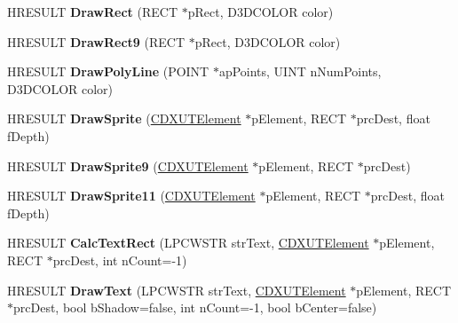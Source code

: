 \begin{DoxyCompactItemize}
\item 
\hypertarget{class_c_d_x_u_t_dialog_adccd346391230d10adfe508ee29a2a8d}{H\+R\+E\+S\+U\+L\+T {\bfseries Draw\+Rect} (R\+E\+C\+T $\ast$p\+Rect, D3\+D\+C\+O\+L\+O\+R color)}\label{class_c_d_x_u_t_dialog_adccd346391230d10adfe508ee29a2a8d}

\item 
\hypertarget{class_c_d_x_u_t_dialog_aa7a777479672b1d96026d78f3d8d65da}{H\+R\+E\+S\+U\+L\+T {\bfseries Draw\+Rect9} (R\+E\+C\+T $\ast$p\+Rect, D3\+D\+C\+O\+L\+O\+R color)}\label{class_c_d_x_u_t_dialog_aa7a777479672b1d96026d78f3d8d65da}

\item 
\hypertarget{class_c_d_x_u_t_dialog_ad3345a7a307fa37e32cb3035a127306f}{H\+R\+E\+S\+U\+L\+T {\bfseries Draw\+Poly\+Line} (P\+O\+I\+N\+T $\ast$ap\+Points, U\+I\+N\+T n\+Num\+Points, D3\+D\+C\+O\+L\+O\+R color)}\label{class_c_d_x_u_t_dialog_ad3345a7a307fa37e32cb3035a127306f}

\item 
\hypertarget{class_c_d_x_u_t_dialog_ab9c6ec0e7fcd65dab08636c65df98001}{H\+R\+E\+S\+U\+L\+T {\bfseries Draw\+Sprite} (\hyperlink{class_c_d_x_u_t_element}{C\+D\+X\+U\+T\+Element} $\ast$p\+Element, R\+E\+C\+T $\ast$prc\+Dest, float f\+Depth)}\label{class_c_d_x_u_t_dialog_ab9c6ec0e7fcd65dab08636c65df98001}

\item 
\hypertarget{class_c_d_x_u_t_dialog_ab06d4fafb9f6ff3362878c2fb00aaf5a}{H\+R\+E\+S\+U\+L\+T {\bfseries Draw\+Sprite9} (\hyperlink{class_c_d_x_u_t_element}{C\+D\+X\+U\+T\+Element} $\ast$p\+Element, R\+E\+C\+T $\ast$prc\+Dest)}\label{class_c_d_x_u_t_dialog_ab06d4fafb9f6ff3362878c2fb00aaf5a}

\item 
\hypertarget{class_c_d_x_u_t_dialog_ab0558eb82095a795bba31070fd5b87f0}{H\+R\+E\+S\+U\+L\+T {\bfseries Draw\+Sprite11} (\hyperlink{class_c_d_x_u_t_element}{C\+D\+X\+U\+T\+Element} $\ast$p\+Element, R\+E\+C\+T $\ast$prc\+Dest, float f\+Depth)}\label{class_c_d_x_u_t_dialog_ab0558eb82095a795bba31070fd5b87f0}

\item 
\hypertarget{class_c_d_x_u_t_dialog_a94d782e76e3e635c67e9d4326dfa9b66}{H\+R\+E\+S\+U\+L\+T {\bfseries Calc\+Text\+Rect} (L\+P\+C\+W\+S\+T\+R str\+Text, \hyperlink{class_c_d_x_u_t_element}{C\+D\+X\+U\+T\+Element} $\ast$p\+Element, R\+E\+C\+T $\ast$prc\+Dest, int n\+Count=-\/1)}\label{class_c_d_x_u_t_dialog_a94d782e76e3e635c67e9d4326dfa9b66}

\item 
\hypertarget{class_c_d_x_u_t_dialog_ab08e695a11e312861cb65a3221b28bc9}{H\+R\+E\+S\+U\+L\+T {\bfseries Draw\+Text} (L\+P\+C\+W\+S\+T\+R str\+Text, \hyperlink{class_c_d_x_u_t_element}{C\+D\+X\+U\+T\+Element} $\ast$p\+Element, R\+E\+C\+T $\ast$prc\+Dest, bool b\+Shadow=false, int n\+Count=-\/1, bool b\+Center=false)}\label{class_c_d_x_u_t_dialog_ab08e695a11e312861cb65a3221b28bc9}


\end{DoxyCompactItemize}
